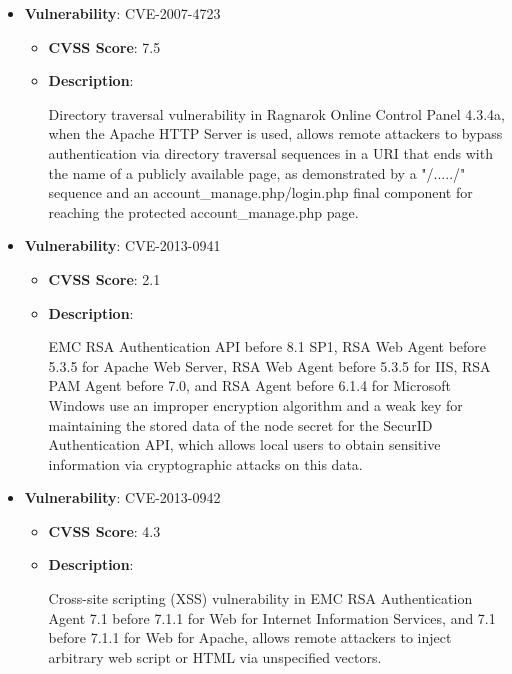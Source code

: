 \documentclass{article}
\begin{document}
\begin{itemize}
        \item \textbf{Vulnerability}: CVE-2007-4723
        \begin{itemize}
            \item \textbf{CVSS Score}:  7.5 
            \item \textbf{Description}:
            \parbox[t]{0.9\linewidth}{
                \ttfamily Directory traversal vulnerability in Ragnarok Online Control Panel 4.3.4a, when the Apache HTTP Server is used, allows remote attackers to bypass authentication via directory traversal sequences in a URI that ends with the name of a publicly available page, as demonstrated by a "/...../" sequence and an account\_manage.php/login.php final component for reaching the protected account\_manage.php page.
            }
        \end{itemize}
    
        \item \textbf{Vulnerability}: CVE-2013-0941
        \begin{itemize}
            \item \textbf{CVSS Score}:  2.1 
            \item \textbf{Description}:
            \parbox[t]{0.9\linewidth}{
                \ttfamily EMC RSA Authentication API before 8.1 SP1, RSA Web Agent before 5.3.5 for Apache Web Server, RSA Web Agent before 5.3.5 for IIS, RSA PAM Agent before 7.0, and RSA Agent before 6.1.4 for Microsoft Windows use an improper encryption algorithm and a weak key for maintaining the stored data of the node secret for the SecurID Authentication API, which allows local users to obtain sensitive information via cryptographic attacks on this data.
            }
        \end{itemize}
    
        \item \textbf{Vulnerability}: CVE-2013-0942
        \begin{itemize}
            \item \textbf{CVSS Score}:  4.3 
            \item \textbf{Description}:
            \parbox[t]{0.9\linewidth}{
                \ttfamily Cross-site scripting (XSS) vulnerability in EMC RSA Authentication Agent 7.1 before 7.1.1 for Web for Internet Information Services, and 7.1 before 7.1.1 for Web for Apache, allows remote attackers to inject arbitrary web script or HTML via unspecified vectors.
            }
        \end{itemize}
    

\end{itemize}
\end{document}
